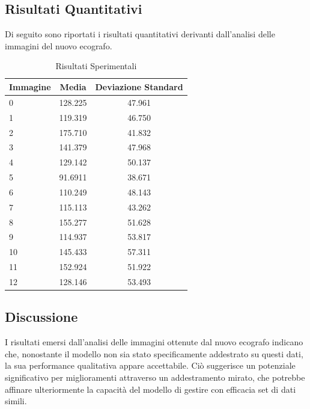 \subsection{Risultati Quantitativi}
\label{subsec:risultati_quantitativi}
Di seguito sono riportati i risultati quantitativi derivanti dall'analisi delle immagini del nuovo
ecografo.

\begin{table}[ht]
    \centering
    \begin{tabular}{|l|c|c|}
    \hline
        \textbf{Immagine} & \textbf{Media} & \textbf{Deviazione Standard} \\ 
        \hline
        \hline
        0  & 128.225 & 47.961 \\ \hline
        1  & 119.319 & 46.750 \\ \hline
        2  & 175.710 & 41.832 \\ \hline
        3  & 141.379 & 47.968 \\ \hline
        4  & 129.142 & 50.137 \\ \hline
        5  & 91.6911 & 38.671 \\ \hline
        6  & 110.249 & 48.143 \\ \hline
        7  & 115.113 & 43.262 \\ \hline
        8  & 155.277 & 51.628 \\ \hline
        9  & 114.937 & 53.817 \\ \hline
        10 & 145.433 & 57.311 \\ \hline
        11 & 152.924 & 51.922 \\ \hline
        12 & 128.146 & 53.493 \\ \hline
    \end{tabular}
    \caption{Risultati Sperimentali}
    \label{tab:risultati_sperimentali}
\end{table}

\subsection{Discussione}
\label{subsec:discussione}
I risultati emersi dall'analisi delle immagini ottenute dal nuovo ecografo indicano che, nonostante
il modello non sia stato specificamente addestrato su questi dati, la sua performance qualitativa
appare accettabile. Ciò suggerisce un potenziale significativo per miglioramenti attraverso un
addestramento mirato, che potrebbe affinare ulteriormente la capacità del modello di gestire con
efficacia set di dati simili.
